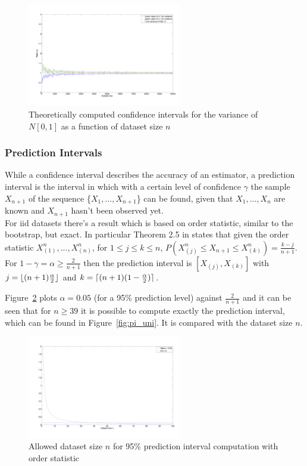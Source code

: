 \documentclass[10pt]{article}
\DeclarePairedDelimiter{\ceil}{\lceil}{\rceil}
\DeclarePairedDelimiter{\floor}{\lfloor}{\rfloor}
\begin{document}
\begin{figure}[h]
  \centering
  \includegraphics[width=0.6\textwidth]{images/hw1_4_c_norm_chi}
  \caption{Theoretically computed confidence intervals for the variance of $N[0,1]$ as a function of dataset size $n$}
  \label{fig:norm_n_var_chi}
\end{figure}

\FloatBarrier

\subsubsection*{Prediction Intervals}
While a confidence interval describes the accuracy of an estimator, a prediction interval is the interval in which with a certain level of confidence $\gamma$ the sample $X_{n+1}$ of the sequence \{$X_1, ... , X_{n+1}$\} can be found, given that $X_1, ..., X_n$ are known and $X_{n+1}$ hasn't been observed yet. \\
For iid datasets there's a result which is based on order statistic, similar to the bootstrap, but exact. In particular Theorem 2.5 in \cite{leb} states that given the order statistic $X_{(1)}^n, ..., X_{(n)}^n$, for $1 \le j \le k \le n$, $P(X_{(j)}^n \le X_{n+1} \le X_{(k)}^n) = \frac{k-j}{n+1}$. For $1 - \gamma = \alpha \ge \frac{2}{n+1}$ then the prediction interval is $[X_{(j)}, X_{(k)}]$ with $j = \floor{(n+1)\frac{\alpha}{2}}$ and $k = \ceil{(n+1)(1-\frac{\alpha}{2})}$.

Figure~\ref{fig:alpha} plots $\alpha = 0.05$ (for a 95\% prediction level) against $\frac{2}{n+1}$ and it can be seen that for $n \ge 39$ it is possible to compute exactly the prediction interval, which can be found in Figure~\ref{fig:pi_uni}. It is compared with the dataset size $n$.


\begin{figure}[h!]
  \centering
  \includegraphics[width=0.6\textwidth]{images/hw1_4_d_alpha}
  \caption{Allowed dataset size $n$ for 95\% prediction interval computation with order statistic}
  \label{fig:alpha}
\end{figure}
\end{document}
